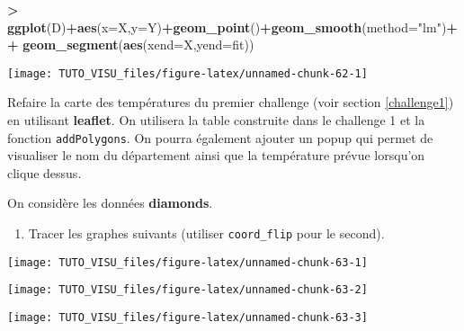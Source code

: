 \documentclass[]{book}
\newenvironment{Shaded}{\begin{snugshade}}{\end{snugshade}}
\newcommand{\DataTypeTok}[1]{\textcolor[rgb]{0.13,0.29,0.53}{#1}}
\newcommand{\KeywordTok}[1]{\textcolor[rgb]{0.13,0.29,0.53}{\textbf{#1}}}
\newcommand{\NormalTok}[1]{#1}
\newcommand{\OperatorTok}[1]{\textcolor[rgb]{0.81,0.36,0.00}{\textbf{#1}}}
\newcommand{\StringTok}[1]{\textcolor[rgb]{0.31,0.60,0.02}{#1}}
\providecommand{\tightlist}{%
  \setlength{\itemsep}{0pt}\setlength{\parskip}{0pt}}
\theoremstyle{definition}
\theoremstyle{definition}
\theoremstyle{definition}
\theoremstyle{remark}
\let\BeginKnitrBlock\begin \let\EndKnitrBlock\end
\begin{document}
\begin{Shaded}
\begin{Highlighting}[]
\OperatorTok{>}\StringTok{ }\KeywordTok{ggplot}\NormalTok{(D)}\OperatorTok{+}\KeywordTok{aes}\NormalTok{(}\DataTypeTok{x=}\NormalTok{X,}\DataTypeTok{y=}\NormalTok{Y)}\OperatorTok{+}\KeywordTok{geom_point}\NormalTok{()}\OperatorTok{+}\KeywordTok{geom_smooth}\NormalTok{(}\DataTypeTok{method=}\StringTok{"lm"}\NormalTok{)}\OperatorTok{+}
\OperatorTok{+}\StringTok{   }\KeywordTok{geom_segment}\NormalTok{(}\KeywordTok{aes}\NormalTok{(}\DataTypeTok{xend=}\NormalTok{X,}\DataTypeTok{yend=}\NormalTok{fit))}
\end{Highlighting}
\end{Shaded}

\begin{center}\texttt{[image: TUTO\_VISU\_files/figure-latex/unnamed-chunk-62-1]} \end{center}

\BeginKnitrBlock{exercise}[Challenge]
\protect\hypertarget{exr:ggplot-challenge}{}{\label{exr:ggplot-challenge} \iffalse (Challenge) \fi{} }

Refaire la carte des températures du premier challenge (voir section \ref{challenge1}) en utilisant \textbf{leaflet}. On utilisera la table construite dans le challenge 1 et la fonction \texttt{addPolygons}. On pourra également ajouter un popup qui permet de visualiser le nom du département ainsi que la température prévue lorsqu'on clique dessus.
\EndKnitrBlock{exercise}

On considère les données \textbf{diamonds}.

\begin{enumerate}
\def\labelenumi{\arabic{enumi}.}
\tightlist
\item
  Tracer les graphes suivants (utiliser \texttt{coord\_flip} pour le second).
\end{enumerate}

\begin{center}\texttt{[image: TUTO\_VISU\_files/figure-latex/unnamed-chunk-63-1]} \end{center}

\begin{center}\texttt{[image: TUTO\_VISU\_files/figure-latex/unnamed-chunk-63-2]} \end{center}

\begin{center}\texttt{[image: TUTO\_VISU\_files/figure-latex/unnamed-chunk-63-3]} \end{center}
\end{document}
